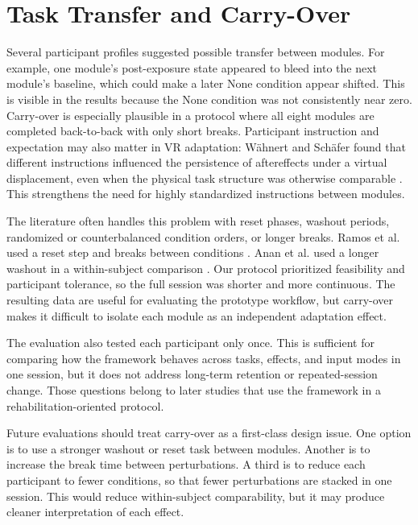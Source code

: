 \section{Task Transfer and Carry-Over}
\label{sec:discussion-transfer-carryover}

Several participant profiles suggested possible transfer between modules. For example, one module's post-exposure state appeared to bleed into the next module's baseline, which could make a later None condition appear shifted. This is visible in the results because the None condition was not consistently near zero. Carry-over is especially plausible in a protocol where all eight modules are completed back-to-back with only short breaks. Participant instruction and expectation may also matter in VR adaptation: Wähnert and Schäfer found that different instructions influenced the persistence of aftereffects under a virtual displacement, even when the physical task structure was otherwise comparable \cite{Wahnert2024}. This strengthens the need for highly standardized instructions between modules.

The literature often handles this problem with reset phases, washout periods, randomized or counterbalanced condition orders, or longer breaks. Ramos et al. used a reset step and breaks between conditions \cite{Ramos2019}. Anan et al. used a longer washout in a within-subject comparison \cite{anan2025comparative}. Our protocol prioritized feasibility and participant tolerance, so the full session was shorter and more continuous. The resulting data are useful for evaluating the prototype workflow, but carry-over makes it difficult to isolate each module as an independent adaptation effect.

The evaluation also tested each participant only once. This is sufficient for comparing how the framework behaves across tasks, effects, and input modes in one session, but it does not address long-term retention or repeated-session change. Those questions belong to later studies that use the framework in a rehabilitation-oriented protocol.

Future evaluations should treat carry-over as a first-class design issue. One option is to use a stronger washout or reset task between modules. Another is to increase the break time between perturbations. A third is to reduce each participant to fewer conditions, so that fewer perturbations are stacked in one session. This would reduce within-subject comparability, but it may produce cleaner interpretation of each effect.


